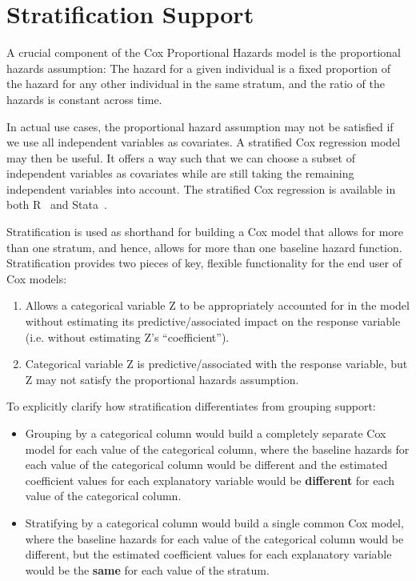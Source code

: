 \section{Stratification Support}\label{cox:stratified}
A crucial component of the Cox Proportional Hazards model is the proportional hazards assumption:
The hazard for a given individual is a fixed proportion of the hazard for any
other individual in the same stratum, and the ratio of the hazards is constant
across time.

In actual use cases, the proportional hazard assumption may not be satisfied if
we use all independent variables as covariates. A stratified Cox regression
model may then be useful. It offers a way such that we can choose a subset of
independent variables as covariates while are still taking the remaining
independent variables into account. The stratified Cox regression is available
in both R~\cite{r-cox} and Stata~\cite{stata-cox}.

Stratification is used as shorthand for building a Cox model that allows for
more than one stratum, and hence, allows for more than one baseline hazard
function.  Stratification provides two pieces of key, flexible functionality for
the end user of Cox models:
\begin{enumerate}
    \item Allows a categorical variable Z to be appropriately accounted for in
    the model without estimating its predictive/associated impact on the
    response variable (i.e. without estimating Z's ``coefficient'').
    \item Categorical variable Z is predictive/associated with the response
    variable, but Z may not satisfy the proportional hazards assumption.
\end{enumerate}

To explicitly clarify how stratification differentiates from grouping support:
\begin{itemize}
    \item Grouping by a categorical column would build a completely separate
    Cox model for each value of the categorical column, where the baseline
    hazards for each value of the categorical column would be different and
    the estimated coefficient values for each explanatory variable would be
    \textbf{different} for each value of the categorical column.
    \item Stratifying by a categorical column would build a single
    common Cox model, where the baseline hazards for each value of the
    categorical column would be different, but the estimated coefficient values
    for each explanatory variable would be the \textbf{same} for each value of the stratum.
\end{itemize}

